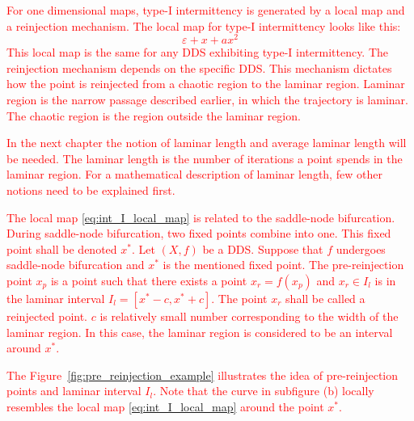\textcolor{red}{
For one dimensional maps, type-I intermittency is generated by a local map and a reinjection mechanism.
The local map for type-I intermittency looks like this:
\begin{equation}
\varepsilon + x + a x^2 \label{eq:int_I_local_map}
\end{equation}
This local map is the same for any DDS exhibiting type-I intermittency.
The reinjection mechanism depends on the specific DDS.
This mechanism dictates how the point is reinjected from a chaotic region to the laminar region.
Laminar region is the narrow passage described earlier, in which the trajectory is laminar.
The chaotic region is the region outside the laminar region.
}
\par
\textcolor{red}{
In the next chapter the notion of laminar length and average laminar length will be needed.
The laminar length is the number of iterations a point spends in the laminar region.
For a mathematical description of laminar length, few other notions need to be explained first.
}
\par
\textcolor{red}{
The local map \ref{eq:int_I_local_map} is related to the saddle-node bifurcation.
During saddle-node bifurcation, two fixed points combine into one.
This fixed point shall be denoted $x^{*}$.
Let $(X, f)$ be a DDS. Suppose that $f$ undergoes saddle-node bifurcation and $x^{*}$ is the mentioned fixed point.
The pre-reinjection point $x_p$ is a point such that there exists a point $x_r = f(x_p)$ and $x_r \in I_l$ is in the laminar interval $I_l = [ x^{*}-c, x^{*}+c ]$.
The point $x_r$ shall be called a reinjected point.
$c$ is relatively small number corresponding to the width of the laminar region.
In this case, the laminar region is considered to be an interval around $x^{*}$.
}
\par
\textcolor{red}{
The Figure~\ref{fig:pre_reinjection_example} illustrates the idea of pre-reinjection points and laminar interval $I_l$.
Note that the curve in subfigure (b) locally resembles the local map \ref{eq:int_I_local_map} around the point $x^{*}$.
}
